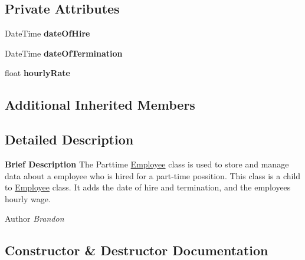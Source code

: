 \subsection*{Private Attributes}
\begin{DoxyCompactItemize}
\item 
\hypertarget{class_all_employees_1_1_parttime_employee_ae9217b6e9531dd5f6ac9029982bab405}{}Date\+Time {\bfseries date\+Of\+Hire}\label{class_all_employees_1_1_parttime_employee_ae9217b6e9531dd5f6ac9029982bab405}

\item 
\hypertarget{class_all_employees_1_1_parttime_employee_a98a60c754150cb7ff049b1a6f9eea5bc}{}Date\+Time {\bfseries date\+Of\+Termination}\label{class_all_employees_1_1_parttime_employee_a98a60c754150cb7ff049b1a6f9eea5bc}

\item 
\hypertarget{class_all_employees_1_1_parttime_employee_abbd98191b1a250e7910012c51f85bcea}{}float {\bfseries hourly\+Rate}\label{class_all_employees_1_1_parttime_employee_abbd98191b1a250e7910012c51f85bcea}

\end{DoxyCompactItemize}
\subsection*{Additional Inherited Members}


\subsection{Detailed Description}
{\bfseries Brief Description} The Parttime \hyperlink{class_all_employees_1_1_employee}{Employee} class is used to store and manage data about a employee who is hired for a part-\/time possition. This class is a child to \hyperlink{class_all_employees_1_1_employee}{Employee} class. It adds the date of hire and termination, and the employees hourly wage. 

\begin{DoxyAuthor}{Author}
{\itshape Brandon} 
\end{DoxyAuthor}


\subsection{Constructor \& Destructor Documentation}
\hypertarget{class_all_employees_1_1_parttime_employee_aefdb20ed1cc9fb007068380a97e3f51e}{}
